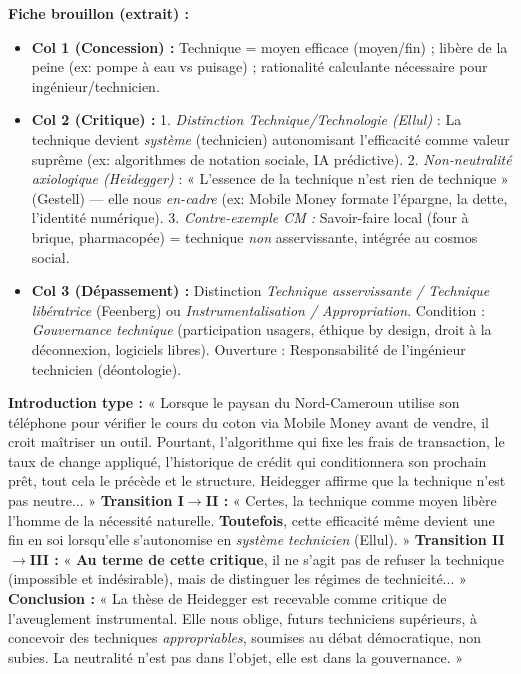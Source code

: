 \documentclass[11pt]{article}
\begin{document}
\begin{corrige}
\textbf{Fiche brouillon (extrait) :}
\begin{itemize}
    \item \textbf{Col 1 (Concession) :} Technique = moyen efficace (moyen/fin) ; libère de la peine (ex: pompe à eau vs puisage) ; rationalité calculante nécessaire pour ingénieur/technicien.
    \item \textbf{Col 2 (Critique) :} 1. \emph{Distinction Technique/Technologie (Ellul)} : La technique devient \emph{système} (technicien) autonomisant l'efficacité comme valeur suprême (ex: algorithmes de notation sociale, IA prédictive). 2. \emph{Non-neutralité axiologique (Heidegger)} : « L'essence de la technique n'est rien de technique » (Gestell) — elle nous \emph{en-cadre} (ex: Mobile Money formate l'épargne, la dette, l'identité numérique). 3. \emph{Contre-exemple CM :} Savoir-faire local (four à brique, pharmacopée) = technique \emph{non} asservissante, intégrée au cosmos social.
    \item \textbf{Col 3 (Dépassement) :} Distinction \emph{Technique asservissante / Technique libératrice} (Feenberg) ou \emph{Instrumentalisation / Appropriation}. Condition : \emph{Gouvernance technique} (participation usagers, éthique by design, droit à la déconnexion, logiciels libres). Ouverture : Responsabilité de l'ingénieur technicien (déontologie).
\end{itemize}
\textbf{Introduction type :} « Lorsque le paysan du Nord-Cameroun utilise son téléphone pour vérifier le cours du coton via Mobile Money avant de vendre, il croit maîtriser un outil. Pourtant, l'algorithme qui fixe les frais de transaction, le taux de change appliqué, l'historique de crédit qui conditionnera son prochain prêt, tout cela le précède et le structure. Heidegger affirme que la technique n'est pas neutre... »
\textbf{Transition I$\rightarrow$II :} « Certes, la technique comme moyen libère l'homme de la nécessité naturelle. \textbf{Toutefois}, cette efficacité même devient une fin en soi lorsqu'elle s'autonomise en \emph{système technicien} (Ellul). »
\textbf{Transition II$\rightarrow$III :} « \textbf{Au terme de cette critique}, il ne s'agit pas de refuser la technique (impossible et indésirable), mais de distinguer les régimes de technicité... »
\textbf{Conclusion :} « La thèse de Heidegger est recevable comme critique de l'aveuglement instrumental. Elle nous oblige, futurs techniciens supérieurs, à concevoir des techniques \emph{appropriables}, soumises au débat démocratique, non subies. La neutralité n'est pas dans l'objet, elle est dans la gouvernance. »
\end{corrige}
\end{document}
